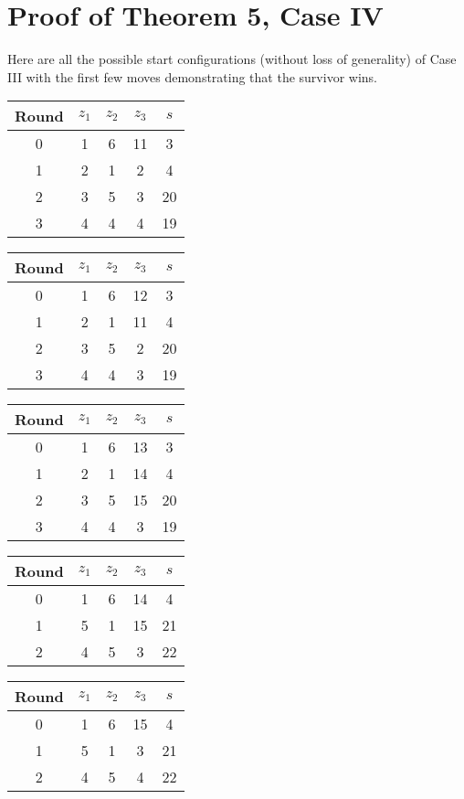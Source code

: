 \chapter{Proof of Theorem 5, Case IV}\label{appendix:planarZombies}

Here are all the possible start configurations (without loss of generality) of Case III with the first few moves demonstrating that the survivor wins.

\begin{multicols}{2}

\begin{tabular}{c | c | c | c | c }
Round & $z_1$ & $z_2$ & $z_3$ & $s$ \\
\hline
0 & 1 & 6 & 11 & 3 \\
1 & 2 & 1 & 2 & 4 \\
2 & 3 & 5 & 3 & 20 \\
3 & 4 & 4 & 4 & 19
\end{tabular}


\begin{tabular}{c | c | c | c | c }
Round & $z_1$ & $z_2$ & $z_3$ & $s$ \\
\hline
0 & 1 & 6 & 12 & 3 \\
1 & 2 & 1 & 11 & 4 \\
2 & 3 & 5 & 2 & 20 \\
3 & 4 & 4 & 3 & 19
\end{tabular}


\begin{tabular}{c | c | c | c | c }
Round & $z_1$ & $z_2$ & $z_3$ & $s$ \\
\hline
0 & 1 & 6 & 13 & 3 \\
1 & 2 & 1 & 14 & 4 \\
2 & 3 & 5 & 15 & 20 \\
3 & 4 & 4 & 3 & 19
\end{tabular}


\begin{tabular}{c | c | c | c | c }
Round & $z_1$ & $z_2$ & $z_3$ & $s$ \\
\hline
0 & 1 & 6 & 14 & 4 \\
1 & 5 & 1 & 15 & 21 \\
2 & 4 & 5 & 3 & 22 \\
\end{tabular}


\begin{tabular}{c | c | c | c | c }
Round & $z_1$ & $z_2$ & $z_3$ & $s$ \\
\hline
0 & 1 & 6 & 15 & 4 \\
1 & 5 & 1 & 3 & 21 \\
2 & 4 & 5 & 4 & 22 \\
\end{tabular}



\end{multicols}
